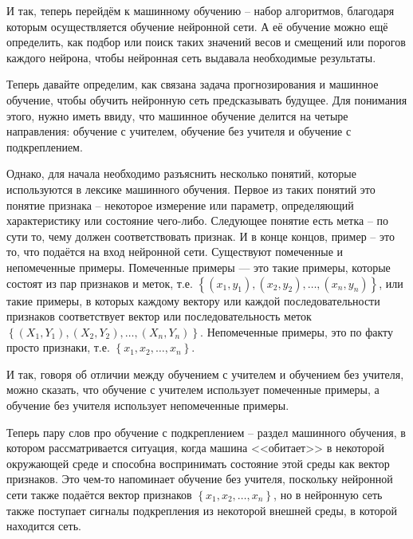 {  \par \redline И так, теперь перейдём к машинному обучению – набор алгоритмов, благодаря которым осуществляется обучение нейронной сети. А её обучение можно ещё определить, как подбор или поиск таких значений весов и смещений или порогов каждого нейрона, чтобы нейронная сеть выдавала необходимые результаты.

  \par \redline Теперь давайте определим, как связана задача прогнозирования и машинное обучение, чтобы обучить нейронную сеть предсказывать будущее. Для понимания этого, нужно иметь ввиду, что машинное обучение делится на четыре направления: обучение с учителем, обучение без учителя и обучение с подкреплением.

  \par \redline Однако, для начала необходимо разъяснить несколько понятий, которые используются в лексике машинного обучения. Первое из таких понятий это понятие признака – некоторое измерение или параметр, определяющий характеристику или состояние чего-либо. Следующее понятие есть метка – по сути то, чему должен соответствовать признак.  И в конце концов, пример – это то, что подаётся на вход нейронной сети. Существуют помеченные и непомеченные примеры. Помеченные примеры — это такие примеры, которые состоят из пар признаков и меток, т.е. $\left\{\left(x_{1}, y_{1}\right), \left(x_{2}, y_{2}\right), \dots, \left(x_{n}, y_{n}\right)\right\}$, или такие примеры, в которых каждому вектору или каждой последовательности признаков соответствует вектор или последовательность меток $\left\{\left(X_{1}, Y_{1}\right), \left(X_{2}, Y_{2}\right), \dots, \left(X_{n}, Y_{n}\right)\right\}$. Непомеченные примеры, это по факту просто признаки, т.е. $\left\{x_{1}, x_{2}, \dots, x_{n}\right\}$.

  \par \redline И так, говоря об отличии между обучением с учителем и обучением без учителя, можно сказать, что обучение с учителем использует помеченные примеры, а обучение без учителя использует непомеченные примеры.

  \par \redline Теперь пару слов про обучение с подкреплением {--} раздел машинного обучения, в котором рассматривается ситуация, когда машина <<обитает>> в некоторой окружающей среде и способна воспринимать состояние этой среды как вектор признаков. Это чем-то напоминает обучение без учителя, поскольку нейронной сети также подаётся вектор признаков $\left\{x_{1}, x_{2}, \dots, x_{n}\right\}$, но в нейронную сеть также поступает сигналы подкрепления из некоторой внешней среды, в которой находится сеть.

}
